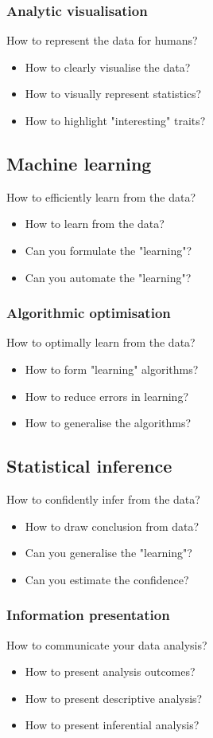 \documentclass[11pt]{article}
\begin{document}
\subsubsection{Analytic visualisation}
\label{sec:org819890a}
How to represent the data for humans?
\begin{itemize}
\item How to clearly visualise the data?
\item How to visually represent statistics?
\item How to highlight "interesting" traits?
\end{itemize}
\subsection{Machine learning}
\label{sec:org27240f3}
How to efficiently learn from the data?
\begin{itemize}
\item How to learn from the data?
\item Can you formulate the "learning"?
\item Can you automate the "learning"?
\end{itemize}
\subsubsection{Algorithmic optimisation}
\label{sec:org93db44d}
How to optimally learn from the data?
\begin{itemize}
\item How to form "learning" algorithms?
\item How to reduce errors in learning?
\item How to generalise the algorithms?
\end{itemize}
\subsection{Statistical inference}
\label{sec:orgadd04ae}
How to confidently infer from the data?
\begin{itemize}
\item How to draw conclusion from data?
\item Can you generalise the "learning"?
\item Can you estimate the confidence?
\end{itemize}
\subsubsection{Information presentation}
\label{sec:org464adbb}
How to communicate your data analysis?
\begin{itemize}
\item How to present analysis outcomes?
\item How to present descriptive analysis?
\item How to present inferential analysis?
\end{itemize}
\end{document}
